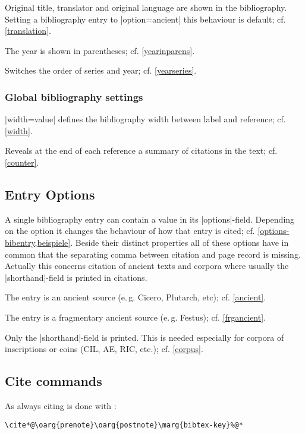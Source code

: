 \documentclass[a4paper,
10pt,
greek,
french,
spanish,
italian,
ngerman,
english
]{ltxdoc}
\begin{document}
Original title, translator and original language are shown in the bibliography. 
Setting a bibliography entry to |option={ancient}| this behaviour is default; cf. \cref{translation}. 

The year is shown in parentheses; cf. \cref{yearinparens}.

Switches the order of series and year; cf. \cref{yearseries}.
 
\subsubsection{Global bibliography settings}

|width={value}| defines the bibliography width between label and reference; cf. \cref{width}.

Reveals at the end of each reference a summary of citations in the text; cf. \cref{counter}.

\subsection{Entry Options}
A single bibliography entry can contain a value in its |options|-field.
Depending on the option it changes the behaviour of how that entry is cited; cf. \cref{options-bibentry,beispiele}. 
Beside their distinct properties all of these options have in common that the separating comma between citation and page record is missing. 
Actually this concerns citation of ancient texts and corpora where usually the |shorthand|-field is printed in citations.

The entry is an ancient source (e.\,g. Cicero, Plutarch, etc); cf. \cref{ancient}.

The entry is a fragmentary ancient source (e.\,g. Festus); cf. \cref{frgancient}.

Only the |shorthand|-field is printed.
This is needed especially for corpora of inscriptions or coins (CIL, AE, RIC, etc.); cf. \cref{corpus}.


\subsection{Cite commands}\label{cite-commands}
\DescribeMacro{\cite}%
As always citing is done with :
\begin{lstlisting}
\cite*@\oarg{prenote}\oarg{postnote}\marg{bibtex-key}%@*
\end{lstlisting}
\end{document}
